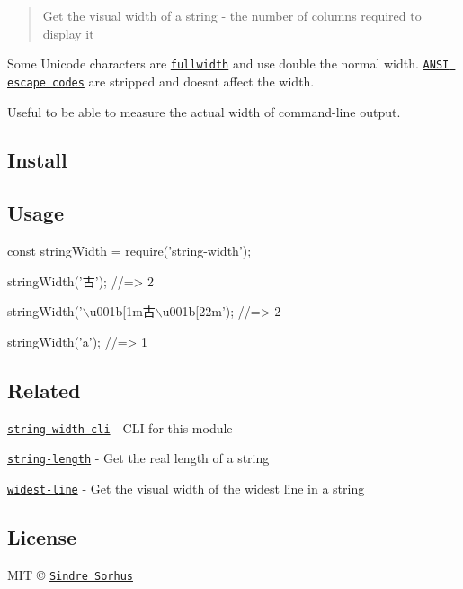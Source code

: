 \begin{quote}
Get the visual width of a string -\/ the number of columns required to display it \end{quote}


Some Unicode characters are \href{https://en.wikipedia.org/wiki/Halfwidth_and_fullwidth_forms}{\tt fullwidth} and use double the normal width. \href{http://en.wikipedia.org/wiki/ANSI_escape_code}{\tt A\+N\+SI escape codes} are stripped and doesn\textquotesingle{}t affect the width.

Useful to be able to measure the actual width of command-\/line output.

\subsection*{Install}




\subsection*{Usage}


\begin{DoxyCode}
const stringWidth = require('string-width');

stringWidth('古');
//=> 2

stringWidth('\(\backslash\)u001b[1m古\(\backslash\)u001b[22m');
//=> 2

stringWidth('a');
//=> 1
\end{DoxyCode}


\subsection*{Related}


\begin{DoxyItemize}
\item \href{https://github.com/sindresorhus/string-width-cli}{\tt string-\/width-\/cli} -\/ C\+LI for this module
\item \href{https://github.com/sindresorhus/string-length}{\tt string-\/length} -\/ Get the real length of a string
\item \href{https://github.com/sindresorhus/widest-line}{\tt widest-\/line} -\/ Get the visual width of the widest line in a string
\end{DoxyItemize}

\subsection*{License}

M\+IT © \href{https://sindresorhus.com}{\tt Sindre Sorhus} 